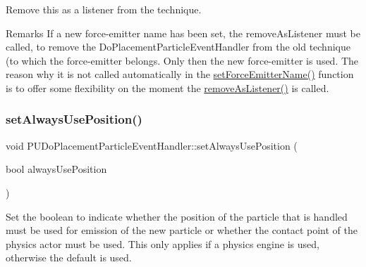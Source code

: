 Remove this as a listener from the technique. \begin{DoxyRemark}{Remarks}
If a new force-\/emitter name has been set, the remove\+As\+Listener must be called, to remove the Do\+Placement\+Particle\+Event\+Handler from the old technique (to which the force-\/emitter belongs. Only then the new force-\/emitter is used. The reason why it is not called automatically in the \hyperlink{classPUDoPlacementParticleEventHandler_a3f2f070e0ebaeb4f15f8f8f9bf4c8237}{set\+Force\+Emitter\+Name()} function is to offer some flexibility on the moment the \hyperlink{classPUDoPlacementParticleEventHandler_a2d8d0acd323398efa7ff99f64a604c5f}{remove\+As\+Listener()} is called. 
\end{DoxyRemark}
\mbox{\label{classPUDoPlacementParticleEventHandler_a51a2f5293ed320aff56a71749e9d83a0}} 
\subsubsection{\texorpdfstring{set\+Always\+Use\+Position()}{setAlwaysUsePosition()}\hspace{0.1cm}{\footnotesize\ttfamily [1/2]}}
{\footnotesize\ttfamily void P\+U\+Do\+Placement\+Particle\+Event\+Handler\+::set\+Always\+Use\+Position (\begin{DoxyParamCaption}\item[{bool}]{always\+Use\+Position }\end{DoxyParamCaption})\hspace{0.3cm}{\ttfamily [inline]}}

Set the boolean to indicate whether the position of the particle that is handled must be used for emission of the new particle or whether the contact point of the physics actor must be used. This only applies if a physics engine is used, otherwise the default is used. \mbox{\label{classPUDoPlacementParticleEventHandler_a51a2f5293ed320aff56a71749e9d83a0}} 

